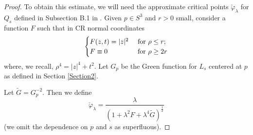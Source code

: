 \documentclass[a4paper,12pt]{amsart}
\renewcommand{\phi}{\varphi}
\renewcommand{\l}{\lambda }
\newcommand{\var}{\varphi }
\begin{document}
\begin{proof}
To obtain this estimate, we will need the approximate critical points $\breve{\phi}_{\lambda}$ for $Q_s$ defined in Subsection B.1 in \cite{CMY2}.
 Given $p\in S^3$ and $r>0$ small, consider a function $F$ such that in CR normal coordinates
$$ \begin{cases}
  F(z,t) = |z|^2 & \hbox{ for } \rho\leq r; \\
  F \equiv 0 & \hbox{ for } \rho\geq 2 r
  \end{cases}$$
  where, we recall, $\rho^4=|z|^4+t^2$.
  Let $G_p$ be the Green function for $L_s$ centered at $p$ as defined in Section \ref{Section2}.
  
  Let $\widetilde{G}=G_p^{-2}$. Then we define
  $$\breve{\var}_{\lambda} = \frac{\l}{\left( 1 + \l^2 F + \l^4 \tilde{G} \right)^{\frac 12}}$$
  (we omit the dependence on $p$ and $s$ as superfluous).


\end{proof}
\end{document}
